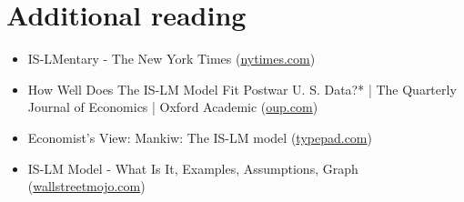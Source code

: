 \documentclass[10pt]{article}
\begin{document}
\section*{Additional reading}
\begin{itemize}
  \item IS-LMentary - The New York Times (\href{http://nytimes.com}{nytimes.com})
  \item How Well Does The IS-LM Model Fit Postwar U. S. Data?* | The Quarterly Journal of Economics | Oxford Academic (\href{http://oup.com}{oup.com})
  \item Economist's View: Mankiw: The IS-LM model (\href{http://typepad.com}{typepad.com})
  \item IS-LM Model - What Is It, Examples, Assumptions, Graph (\href{http://wallstreetmojo.com}{wallstreetmojo.com})
\end{itemize}
\end{document}
